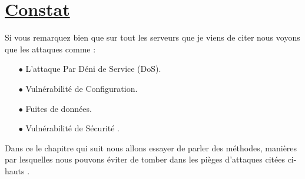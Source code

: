  \section*{\underline{Constat}}
 Si vous remarquez  bien que sur tout les serveurs que je viens de citer nous voyons que les attaques comme :
 \begin{enumerate}
 	\item[$\bullet$] L'attaque Par Déni de Service (DoS).
 	\item[$\bullet$] Vulnérabilité de Configuration.
 	\item[$\bullet$] Fuites de données.
 	\item[$\bullet$] Vulnérabilité de Sécurité  .
 \end{enumerate}
 
Dans ce le chapitre qui suit nous allons essayer de parler des méthodes,  manières par lesquelles nous pouvons éviter de tomber  dans les pièges d'attaques citées ci-hauts .
